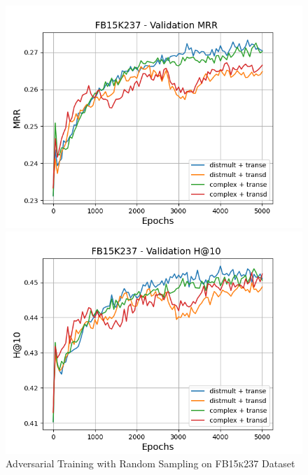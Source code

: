 \begin{figure}
\begin{minipage}{.5\textwidth}
      \includegraphics[width=0.9\linewidth]{figures/results/gan_train/pretrained/random/fb15k237/gan_train_random_fb15k237_mrrs.png}
    \end{minipage}%
    \begin{minipage}{.5\textwidth}
      \centering
      \includegraphics[width=0.9\linewidth]{figures/results/gan_train/pretrained/random/fb15k237/gan_train_random_fb15k237_hit10s.png}
    \end{minipage}%
    \caption{Adversarial Training with Random Sampling on \textsc{FB15k237} Dataset}
    \label{fig:test}
\end{figure}

\pagebreak